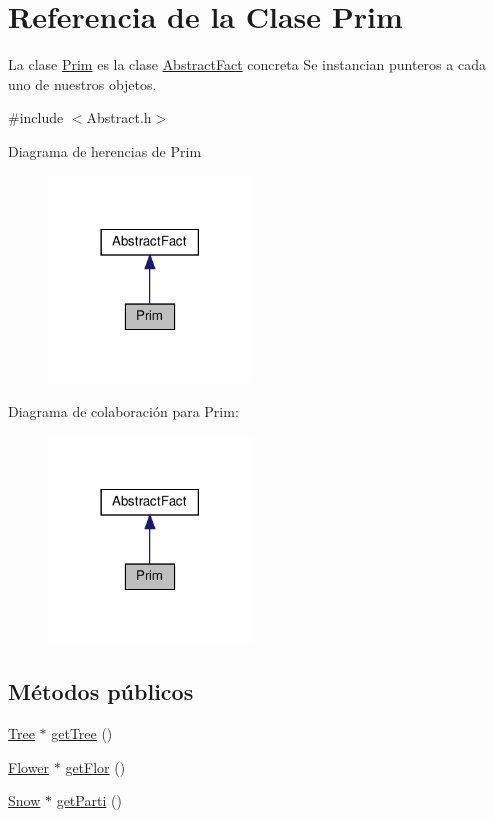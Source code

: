 \hypertarget{classPrim}{}\section{Referencia de la Clase Prim}
\label{classPrim}


La clase \hyperlink{classPrim}{Prim} es la clase \hyperlink{classAbstractFact}{Abstract\+Fact} concreta  Se instancian punteros a cada uno de nuestros objetos.  




{\ttfamily \#include $<$Abstract.\+h$>$}



Diagrama de herencias de Prim\nopagebreak
\begin{figure}[H]
\begin{center}
\leavevmode
\includegraphics[width=153pt]{classPrim__inherit__graph}
\end{center}
\end{figure}


Diagrama de colaboración para Prim\+:\nopagebreak
\begin{figure}[H]
\begin{center}
\leavevmode
\includegraphics[width=153pt]{classPrim__coll__graph}
\end{center}
\end{figure}
\subsection*{Métodos públicos}
\begin{DoxyCompactItemize}
\item 
\hyperlink{classTree}{Tree} $\ast$ \hyperlink{classPrim_aeccbb4f2821f8bc508647e2f6dd95370}{get\+Tree} ()
\item 
\hyperlink{classFlower}{Flower} $\ast$ \hyperlink{classPrim_a92e3d118382a67173d008d5d82e4798c}{get\+Flor} ()
\item 
\hyperlink{classSnow}{Snow} $\ast$ \hyperlink{classPrim_ae2c1e853547a33662bd00baff26d67f8}{get\+Parti} ()
\end{DoxyCompactItemize}


